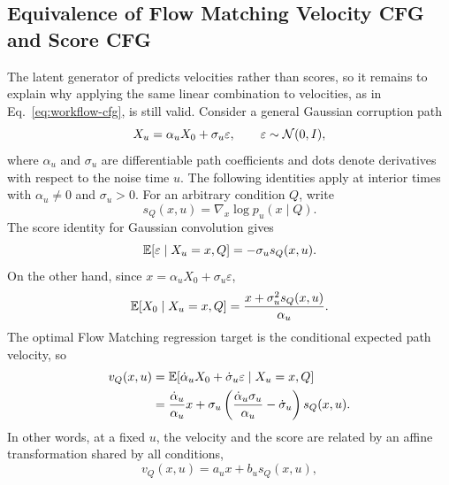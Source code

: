 \subsection{Equivalence of Flow Matching Velocity CFG and Score CFG}

The latent generator of \method predicts velocities rather than scores, so it remains to explain why applying the same linear combination to velocities, as in Eq.~\eqref{eq:workflow-cfg}, is still valid. Consider a general Gaussian corruption path
\begin{equation}
    X_u=\alpha_u X_0+\sigma_u\varepsilon,
    \qquad
    \varepsilon\sim\mathcal{N}(0,I),
    \label{eq:app-cfg-gaussian-path}
\end{equation}
where $\alpha_u$ and $\sigma_u$ are differentiable path coefficients and dots denote derivatives with respect to the noise time $u$. The following identities apply at interior times with $\alpha_u\neq0$ and $\sigma_u>0$. For an arbitrary condition $Q$, write
\begin{equation}
    s_Q(x,u)=\nabla_x\log p_u(x\mid Q).
\end{equation}
The score identity for Gaussian convolution gives
\begin{equation}
    \mathbb{E}[\varepsilon\mid X_u=x,Q]
    =-\sigma_u s_Q(x,u).
    \label{eq:app-cfg-eps-score}
\end{equation}
On the other hand, since $x=\alpha_uX_0+\sigma_u\varepsilon$,
\begin{equation}
    \mathbb{E}[X_0\mid X_u=x,Q]
    =\frac{x+\sigma_u^2s_Q(x,u)}{\alpha_u}.
    \label{eq:app-cfg-x0-score}
\end{equation}
The optimal Flow Matching regression target is the conditional expected path velocity, so
\begin{equation}
\begin{aligned}
    v_Q(x,u)
    &=\mathbb{E}[\dot\alpha_u X_0+\dot\sigma_u\varepsilon
      \mid X_u=x,Q]\\
    &=\frac{\dot\alpha_u}{\alpha_u}x
      +\sigma_u\left(
        \frac{\dot\alpha_u\sigma_u}{\alpha_u}
        -\dot\sigma_u
      \right)s_Q(x,u).
\end{aligned}
\label{eq:app-cfg-velocity-score}
\end{equation}
In other words, at a fixed $u$, the velocity and the score are related by an affine transformation shared by all conditions,
\begin{equation}
    v_Q(x,u)=a_u x+b_u s_Q(x,u),
    \label{eq:app-cfg-affine}
\end{equation}
